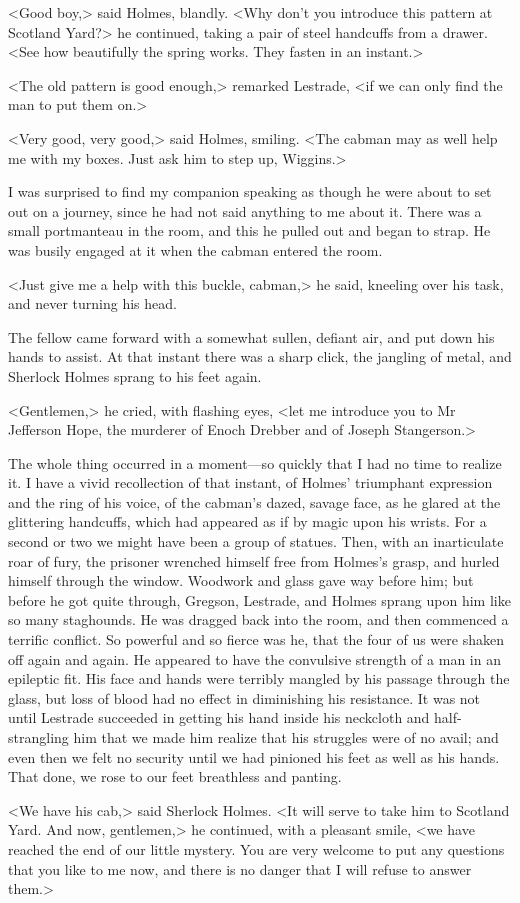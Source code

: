 <Good boy,> said Holmes, blandly. <Why don't you introduce this pattern at Scotland Yard?> he continued, taking a pair of steel handcuffs from a drawer. <See how beautifully the spring works. They fasten in an instant.>

<The old pattern is good enough,> remarked Lestrade, <if we can only find the man to put them on.>

<Very good, very good,> said Holmes, smiling. <The cabman may as well help me with my boxes. Just ask him to step up, Wiggins.>

I was surprised to find my companion speaking as though he were about to set out on a journey, since he had not said anything to me about it. There was a small portmanteau in the room, and this he pulled out and began to strap. He was busily engaged at it when the cabman entered the room.

<Just give me a help with this buckle, cabman,> he said, kneeling over his task, and never turning his head.

The fellow came forward with a somewhat sullen, defiant air, and put down his hands to assist. At that instant there was a sharp click, the jangling of metal, and Sherlock Holmes sprang to his feet again.

<Gentlemen,> he cried, with flashing eyes, <let me introduce you to Mr Jefferson Hope, the murderer of Enoch Drebber and of Joseph Stangerson.>

The whole thing occurred in a moment—so quickly that I had no time to realize it. I have a vivid recollection of that instant, of Holmes' triumphant expression and the ring of his voice, of the cabman's dazed, savage face, as he glared at the glittering handcuffs, which had appeared as if by magic upon his wrists. For a second or two we might have been a group of statues. Then, with an inarticulate roar of fury, the prisoner wrenched himself free from Holmes's grasp, and hurled himself through the window. Woodwork and glass gave way before him; but before he got quite through, Gregson, Lestrade, and Holmes sprang upon him like so many staghounds. He was dragged back into the room, and then commenced a terrific conflict. So powerful and so fierce was he, that the four of us were shaken off again and again. He appeared to have the convulsive strength of a man in an epileptic fit. His face and hands were terribly mangled by his passage through the glass, but loss of blood had no effect in diminishing his resistance. It was not until Lestrade succeeded in getting his hand inside his neckcloth and half-strangling him that we made him realize that his struggles were of no avail; and even then we felt no security until we had pinioned his feet as well as his hands. That done, we rose to our feet breathless and panting.

<We have his cab,> said Sherlock Holmes. <It will serve to take him to Scotland Yard. And now, gentlemen,> he continued, with a pleasant smile, <we have reached the end of our little mystery. You are very welcome to put any questions that you like to me now, and there is no danger that I will refuse to answer them.>